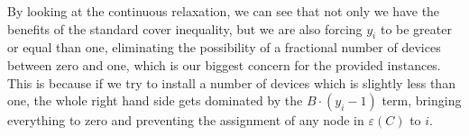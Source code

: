 By looking at the continuous relaxation, we can see that not only we have the benefits of the standard cover inequality, but we are also forcing $y_i$ to be greater or equal than one, eliminating the possibility of a fractional number of devices between zero and one, which is our biggest concern for the provided instances. This is because if we try to install a number of devices which is slightly less than one, the whole right hand side gets dominated by the $B \cdot (y_i - 1)$ term, bringing everything to zero and preventing the assignment of any node in $\varepsilon(C)$ to $i$.
